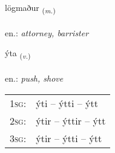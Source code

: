 \documentclass[frontgrid, backgrid]{flacards}\usepackage[]{graphicx}\usepackage[]{xcolor}
\begin{document}
\renewcommand{\flhead}{\vskip5pt \fboxsep=0pt {\small\bfseries\footnotesize Nafnorð | Noun}}
\renewcommand{\fcfoot}{\vskip5pt \fboxsep=0pt \hspace{2pt}{\small\bfseries\footnotesize 2K}}

\renewcommand{\blhead}{\vskip5pt {\small\bfseries\footnotesize Nafnorð | Noun }}
\renewcommand{\bcfoot}{\vskip5pt \hspace{2pt}{\small\bfseries\footnotesize 2K}}


{lögmaður \small{\textsubscript{(\textit{m.})}} \\[1ex] %
\textphonetic{[lœɣmaðʏr]} \\
en.: \emph{attorney, barrister} \\  [2ex]
\renewcommand*{\arraystretch}{0.8}
}

\renewcommand{\flhead}{\vskip5pt \fboxsep=0pt {\small\bfseries\footnotesize Sagnorð | Verb}}
\renewcommand{\fcfoot}{\vskip5pt \fboxsep=0pt \hspace{2pt}{\small\bfseries\footnotesize 2K}}

\renewcommand{\blhead}{\vskip5pt {\small\bfseries\footnotesize Sagnorð | Verb }}
\renewcommand{\bcfoot}{\vskip5pt \hspace{2pt}{\small\bfseries\footnotesize 2K}}


{ýta \small{\textsubscript{(\textit{v.})}} \\[1ex] %
\textphonetic{[iːta]} \\
en.: \emph{push, shove} \\  [2ex]
\renewcommand*{\arraystretch}{0.8}
\begin{tabular}{p{1cm}l}
\textsc{1sg}: & ýti -- ýtti -- ýtt \\ 
\textsc{2sg}: & ýtir -- ýttir -- ýtt \\ 
\textsc{3sg}: & ýtir -- ýtti -- ýtt \\ 
\end{tabular}
}
\end{document}
